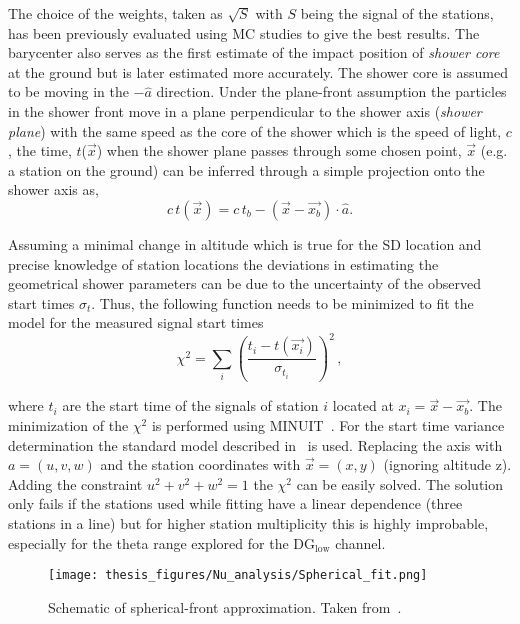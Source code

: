 The choice of the weights, taken as $\sqrt{S} $ with $S$ being the signal of the stations, has been previously evaluated using MC studies to give the best results. The barycenter also serves as the first estimate of the impact position of \textit{shower core} at the ground but is later estimated more accurately. The shower core is assumed to be moving in the $-\hat{a}$ direction. Under the plane-front assumption the particles in the shower front move in a plane perpendicular to the shower axis (\textit{shower plane}) with the same speed as the core of the shower which is the speed of light, $c$, the time, $t$($\vec{x}$) when the shower plane passes through some chosen point, $\vec{x}$ (e.g. a station on the ground) can be inferred through a simple projection onto the shower axis as,
\begin{equation}
  c\,t(\vec{x}) = c\,t_b - (\vec{x}-\vec{x_b})\cdot \hat{a}.
\end{equation}

Assuming a minimal change in altitude which is true for the SD location and precise knowledge of station locations the deviations in estimating the geometrical shower parameters can be due to the uncertainty of the observed start times $\sigma_t$. Thus, the following function needs to be minimized to fit the model for the measured signal start times 
\begin{equation}
  \chi^2 = \sum_{i} \left(\frac{t_i - t(\vec{x_i})}{\sigma_{t_{i}}}\right)^2\, ,
\end{equation}

where $t_i$ are the start time of the signals of station $i$ located at $x_i = \vec{x} - \vec{x_b}$. The minimization of the $\chi^2$ is performed using MINUIT~\cite{James:1975dr}. For the start time variance determination the standard model described in~\cite{PierreAuger:2020yab} is used. Replacing the axis with $a =(u,v,w)$ and the station coordinates with $\vec{x} = (x,y)$ (ignoring altitude z). Adding the constraint $u^2 + v^2 + w^2 = 1$ the $\chi^2$ can be easily solved. The solution only fails if the stations used while fitting have a linear dependence (three stations in a line) but for higher station multiplicity this is highly improbable, especially for the theta range explored for the DG$\mathrm{_{low}}$ channel.

\begin{figure}[h!]
  \centering
  \texttt{[image: thesis\_figures/Nu\_analysis/Spherical\_fit.png]}
  \caption{Schematic of spherical-front approximation. Taken from~\cite{PierreAuger:2020yab}.}
  \label{fig:Spherical_fit}
\end{figure}

